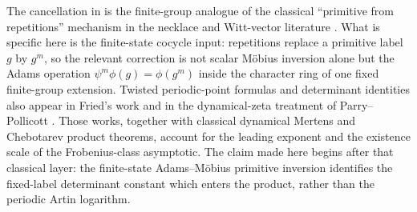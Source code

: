 \begin{remark}
  \label{rem:adams-mobius-literature-position}
  The cancellation in
   is the finite-group analogue
  of the classical ``primitive from repetitions'' mechanism in the
  necklace and Witt-vector literature
  \cite{MetropolisRota1983Necklaces,Wehrhahn1990AperiodicRings}. What
  is specific here is the finite-state cocycle input:
  repetitions replace a primitive label \(g\) by \(g^m\), so the
  relevant correction is not scalar M\"obius inversion alone but the
  Adams operation \(\psi^m\phi(g)=\phi(g^m)\) inside the character ring
  of one fixed finite-group extension. Twisted periodic-point formulas
  and determinant identities also appear in Fried's work
  \cite{Fried1983PeriodicPointsTwistedCoefficients,Fried1983HomologicalIdentitiesClosedOrbits} and in the dynamical-zeta
  treatment of Parry--Pollicott \cite{ParryPollicott1990Zeta}. Those
  works, together with classical dynamical Mertens and Chebotarev product
  theorems, account for the leading exponent and the existence scale of the
  Frobenius-class asymptotic.  The claim made here begins after that classical
  layer: the finite-state Adams--M\"obius primitive inversion identifies the
  fixed-label determinant constant which enters the product, rather than the
  periodic Artin logarithm.
\end{remark}
